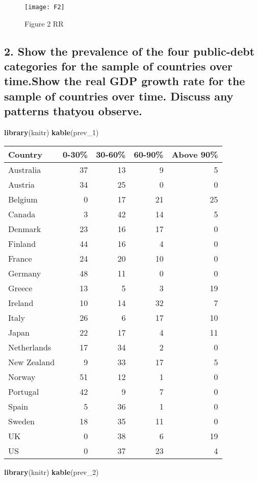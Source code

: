 \documentclass[
]{article}
\newenvironment{Shaded}{\begin{snugshade}}{\end{snugshade}}
\newcommand{\DecValTok}[1]{\textcolor[rgb]{0.00,0.00,0.81}{#1}}
\newcommand{\KeywordTok}[1]{\textcolor[rgb]{0.13,0.29,0.53}{\textbf{#1}}}
\newcommand{\NormalTok}[1]{#1}
\begin{document}
\begin{figure}
\texttt{[image: F2]} \caption{Figure 2 RR}\label{fig:pressure}
\end{figure}

\hypertarget{show-the-prevalence-of-the-four-public-debt-categories-for-the-sample-of-countries-over-time.show-the-real-gdp-growth-rate-for-the-sample-of-countries-over-time.-discuss-any-patterns-thatyou-observe.}{%
\subsection{2. Show the prevalence of the four public-debt categories
for the sample of countries over time.Show the real GDP growth rate for
the sample of countries over time. Discuss any patterns thatyou
observe.}\label{show-the-prevalence-of-the-four-public-debt-categories-for-the-sample-of-countries-over-time.show-the-real-gdp-growth-rate-for-the-sample-of-countries-over-time.-discuss-any-patterns-thatyou-observe.}}

\begin{Shaded}
\begin{Highlighting}[]
\KeywordTok{library}\NormalTok{(knitr)}
\KeywordTok{kable}\NormalTok{(prev_}\DecValTok{1}\NormalTok{)}
\end{Highlighting}
\end{Shaded}

\begin{longtable}[]{@{}lrrrr@{}}
\toprule
Country & 0-30\% & 30-60\% & 60-90\% & Above 90\%\tabularnewline
\midrule
\endhead
Australia & 37 & 13 & 9 & 5\tabularnewline
Austria & 34 & 25 & 0 & 0\tabularnewline
Belgium & 0 & 17 & 21 & 25\tabularnewline
Canada & 3 & 42 & 14 & 5\tabularnewline
Denmark & 23 & 16 & 17 & 0\tabularnewline
Finland & 44 & 16 & 4 & 0\tabularnewline
France & 24 & 20 & 10 & 0\tabularnewline
Germany & 48 & 11 & 0 & 0\tabularnewline
Greece & 13 & 5 & 3 & 19\tabularnewline
Ireland & 10 & 14 & 32 & 7\tabularnewline
Italy & 26 & 6 & 17 & 10\tabularnewline
Japan & 22 & 17 & 4 & 11\tabularnewline
Netherlands & 17 & 34 & 2 & 0\tabularnewline
New Zealand & 9 & 33 & 17 & 5\tabularnewline
Norway & 51 & 12 & 1 & 0\tabularnewline
Portugal & 42 & 9 & 7 & 0\tabularnewline
Spain & 5 & 36 & 1 & 0\tabularnewline
Sweden & 18 & 35 & 11 & 0\tabularnewline
UK & 0 & 38 & 6 & 19\tabularnewline
US & 0 & 37 & 23 & 4\tabularnewline
\bottomrule
\end{longtable}

\begin{Shaded}
\begin{Highlighting}[]
\KeywordTok{library}\NormalTok{(knitr)}
\KeywordTok{kable}\NormalTok{(prev_}\DecValTok{2}\NormalTok{)}
\end{Highlighting}
\end{Shaded}
\end{document}
